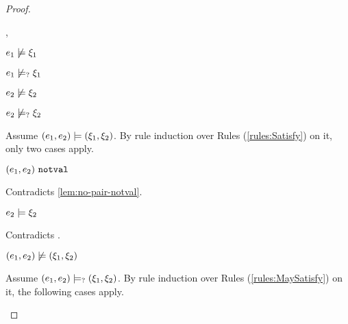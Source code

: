 \begin{proof}
\begin{byCases}
\begin{byCases}
\begin{byCases}
        \item[\cnotsatisfyormay{e_1}{\xi_1},\cnotsatisfyormay{e_2}{\xi_2}]
            \begin{pfsteps*}
            \item $e_1 \not\models \xi_1$  
            \item $e_1 \not\models_{?} \xi_1$  
            \item $e_2 \not\models \xi_2$  
            \item $e_2 \not\models_{?} \xi_2$  
            \end{pfsteps*}
            Assume $(e_1 , e_2) \models (\xi_1 , \xi_2)$. By rule induction over Rules (\ref{rules:Satisfy}) on it, only two cases apply. 
           \begin{byCases}
            \item[\text{(\ref{rule:CSNotValPair})}]
                \begin{pfsteps*}
                \item $(e_1 , e_2) ~\mathtt{notval}$ 
                \end{pfsteps*}
                Contradicts \autoref{lem:no-pair-notval}.
            \item[\text{(\ref{rule:CSPair})}]
                \begin{pfsteps*}
                \item $e_2 \models \xi_2$ 
                \end{pfsteps*}
                Contradicts .
            \end{byCases}
            \begin{pfsteps*}
            \item $(e_1 , e_2) \not\models (\xi_1 , \xi_2)$  
            \end{pfsteps*}
            Assume $(e_1 , e_2) \models_{?} (\xi_1 , \xi_2)$. By rule induction over Rules (\ref{rules:MaySatisfy}) on it, the following cases apply.
            \begin{byCases}
            \item[\text{(\ref{rule:CMSNotVal})}]
                \begin{pfsteps*}

\end{pfsteps*}
\end{byCases}
\end{byCases}
\end{byCases}
\end{byCases}
\end{proof}
